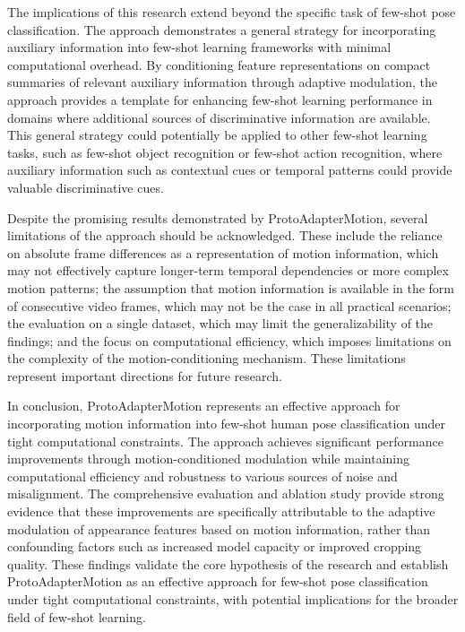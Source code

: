\documentclass[11pt]{article}
\begin{document}
The implications of this research extend beyond the specific task of few-shot pose classification. The approach demonstrates a general strategy for incorporating auxiliary information into few-shot learning frameworks with minimal computational overhead. By conditioning feature representations on compact summaries of relevant auxiliary information through adaptive modulation, the approach provides a template for enhancing few-shot learning performance in domains where additional sources of discriminative information are available. This general strategy could potentially be applied to other few-shot learning tasks, such as few-shot object recognition or few-shot action recognition, where auxiliary information such as contextual cues or temporal patterns could provide valuable discriminative cues.

Despite the promising results demonstrated by ProtoAdapterMotion, several limitations of the approach should be acknowledged. These include the reliance on absolute frame differences as a representation of motion information, which may not effectively capture longer-term temporal dependencies or more complex motion patterns; the assumption that motion information is available in the form of consecutive video frames, which may not be the case in all practical scenarios; the evaluation on a single dataset, which may limit the generalizability of the findings; and the focus on computational efficiency, which imposes limitations on the complexity of the motion-conditioning mechanism. These limitations represent important directions for future research.

In conclusion, ProtoAdapterMotion represents an effective approach for incorporating motion information into few-shot human pose classification under tight computational constraints. The approach achieves significant performance improvements through motion-conditioned modulation while maintaining computational efficiency and robustness to various sources of noise and misalignment. The comprehensive evaluation and ablation study provide strong evidence that these improvements are specifically attributable to the adaptive modulation of appearance features based on motion information, rather than confounding factors such as increased model capacity or improved cropping quality. These findings validate the core hypothesis of the research and establish ProtoAdapterMotion as an effective approach for few-shot pose classification under tight computational constraints, with potential implications for the broader field of few-shot learning.
\end{document}
